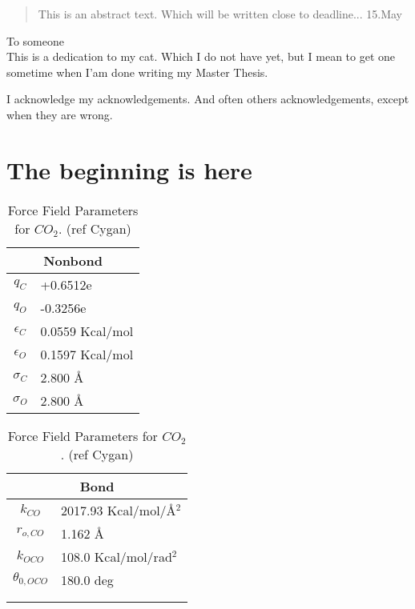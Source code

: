 \documentclass[twoside,english]{uiofysmaster}
\begin{document}

\cleardoublepage
\begin{abstract}
This is an abstract text. Which will be written close to deadline... 15.May
\end{abstract}

\begin{dedication}
  To someone
  \\\vspace{12pt}
  This is a dedication to my cat. Which I do not have yet, but I mean to get one sometime when I'am done writing my Master Thesis.
\end{dedication}

\begin{acknowledgements}
  I acknowledge my acknowledgements. And often others acknowledgements, except when they are wrong.
\end{acknowledgements}

\tableofcontents

\chapter{The beginning is here}

\begin{table}
 \caption{Force Field Parameters for $CO_2$. (ref Cygan)}
 \begin{tabular}[]{|c|l|}
  \hline
  \multicolumn{2}{|c|}{Nonbond} \\ \hline
  $q_C$ & +0.6512e  \\ \hline
  $q_O$ & -0.3256e  \\ \hline
  $\epsilon _C$ & 0.0559 Kcal/mol \\ \hline
  $\epsilon _O$ & 0.1597 Kcal/mol \\ \hline
  $\sigma _C$ & 2.800 \AA{} \\ \hline
  $\sigma _O$ & 2.800 \AA{} \\ \hline
 \end{tabular}
  \begin{tabular}[]{|c|l|}
  \hline
  \multicolumn{2}{|c|}{Bond} \\ \hline
  $k_{CO}$ & 2017.93 Kcal/mol/\AA{}$^2$  \\ \hline
  $r_{o,CO}$ & 1.162 \AA{}  \\ \hline
  $k_{OCO}$ & 108.0 Kcal/mol/rad$^2$ \\ \hline
  $\theta _{0,OCO}$ & 180.0 deg \\ \hline
                    &           \\ \hline
                    &           \\ \hline

 \end{tabular}
 \label{ForceFieldParameters_CO2}
\end{table}
\end{document}
